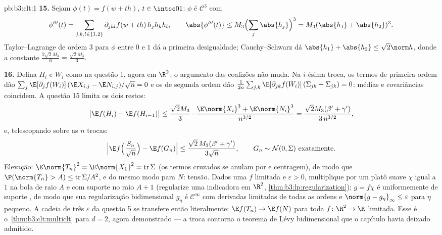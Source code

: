 \begin{solution}{pb:b3:clt:1}
\textbf{15.} Sejam $\phi(t) = f(w + th)$, $t \in \intcc01$:
$\phi$ é $\mathcal C^3$ com
\[
\phi'''(t) = \sum_{j,k,l\in\{1,2\}}\partial_{jkl}f(w +
th)\,h_jh_kh_l, \qquad \abs{\phi'''(t)} \leq
M_3\Bigl(\sum_j\abs{h_j}\Bigr)^3 = M_3(\abs{h_1} +
\abs{h_2})^3 .
\]
Taylor--Lagrange de ordem $3$ para $\phi$ entre $0$ e
$1$ dá a primeira desigualdade; Cauchy--Schwarz dá
$\abs{h_1} + \abs{h_2} \leq \sqrt2\norm h$, donde a
constante $\frac{2\sqrt2M_3}6 = \frac{\sqrt2M_3}3$.

\textbf{16.} Defina $H_i$ e $W_i$ como na questão 1, agora
em $\R^2$; o argumento das coalizões não muda. Na
$i$-ésima troca, os termos de primeira ordem dão
$\sum_j\E[\partial_jf(W_i)]\,(\E X_{i,j} - \E N_{i,j})/
\sqrt n = 0$ e os de segunda ordem dão
$\frac1{2n}\sum_{j,k}\E[\partial_{jk}f(W_i)]\,(\Sigma_{jk}
- \Sigma_{jk}) = 0$: médias e covariâncias coincidem. A questão
15 limita os dois restos:
\[
\bigl|\E f(H_i) - \E f(H_{i-1})\bigr| \leq
\frac{\sqrt2M_3}3\cdot\frac{\E\norm{X_i}^3 +
\E\norm{N_i}^3}{n^{3/2}}
= \frac{\sqrt2M_3(\beta' + \gamma')}{3\,n^{3/2}},
\]
e, telescopando sobre as $n$ trocas:
\[
\Bigl|\E f\Bigl(\frac{S_n}{\sqrt n}\Bigr) - \E
f(G_n)\Bigr| \leq \frac{\sqrt2\,M_3(\beta' +
\gamma')}{3\sqrt n},
\qquad G_n \sim \mathcal N(0, \Sigma)\ \text{exatamente} .
\]
Elevação: $\E\norm{T_n}^2 = \E\norm{X_1}^2 =
\operatorname{tr}\Sigma$ (os termos cruzados se anulam por
 e centragem), de modo que $\P(\norm{T_n} > A) \leq
\operatorname{tr}\Sigma/A^2$, e do mesmo modo para $N$:
tensão. Dados uma $f$  limitada e $\varepsilon
> 0$, multiplique por um platô suave $\chi$ igual a $1$ na
bola de raio $A$ e com suporte no raio $A + 1$
(regularize uma indicadora em $\R^2$,
\cref{thm:b3:lp:regularization}); $g = f\chi$ é uniformemente
 de suporte , de modo que sua regularização
bidimensional $g_\eta$ é $\mathcal C^\infty$ com derivadas
limitadas de todas as ordens e $\norm{g - g_\eta}_\infty
\leq \varepsilon$ para $\eta$ pequeno. A cadeia de três $\varepsilon$
da questão 5 se transfere então literalmente: $\E f(T_n)
\to \E f(N)$ para toda $f \colon \R^2
\to \R$  limitada. Esse é o~\cref{thm:b3:clt:multiclt} para $d = 2$,
agora demonstrado --- a troca contorna o teorema de Lévy
bidimensional que o capítulo havia deixado admitido.


\end{solution}
